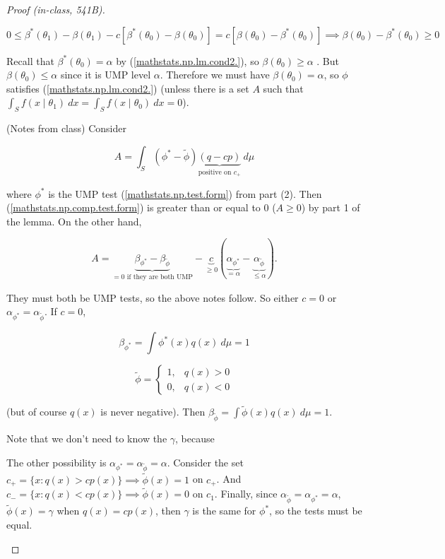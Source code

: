 \begin{proof}[Proof (in-class, 541B)]
\begin{enumerate}
\[
0 \leq \beta^*(\theta_1) - \beta(\theta_1) - c \left[ \beta^*(\theta_0) - \beta(\theta_0) \right] = c \left[ \beta(\theta_0)  -  \beta^*(\theta_0) \right] \implies  \beta(\theta_0)  -  \beta^*(\theta_0) \geq 0
\]

Recall that \(\beta^*(\theta_0) = \alpha\) by (\ref{mathstats.np.lm.cond2.}), so \(  \beta(\theta_0) \geq \alpha\) . But \(  \beta(\theta_0) \leq \alpha\) since it is UMP level \(\alpha\). Therefore we must have \(  \beta(\theta_0) = \alpha\), so \(\phi\) satisfies (\ref{mathstats.np.lm.cond2.}) (unless there is a set \(A\) such that \(\int_S f(x \mid \theta_1) \ dx = \int_S f(x \mid \theta_0) \ dx = 0\)).


(Notes from class) Consider 

\begin{equation}\label{mathstats.np.comp.test.form}
A = \int_S (\phi^* - \tilde{\phi}) \underbrace{(q - cp)}_{\text{positive on } c_+} \ d\mu
\end{equation}

where \(\phi^*\) is the UMP test (\ref{mathstats.np.test.form}) from part (2). Then (\ref{mathstats.np.comp.test.form}) is greater than or equal to 0 (\(A \geq 0\)) by part 1 of the lemma. On the other hand,

\[
A = \underbrace{\beta_{\phi^*} - \beta_{\tilde{\phi}}}_{=0 \text{ if they are both UMP}} - \underbrace{c}_{\geq 0} \left( \underbrace{\alpha_{\phi^*}}_{= \alpha} - \underbrace{\alpha_{\tilde{\phi}}}_{\leq \alpha} \right).
\]

They must both be UMP tests, so the above notes follow. So either \(c = 0\) or \(\alpha_{\phi^*} = \alpha_{\tilde{\phi}}\). If \(c = 0\), 

\[
\beta_{\phi^*}  = \int \phi^*(x) q(x) \ d \mu = 1
\]


\[
\tilde{\phi} = \begin{cases}
1, & q(x) > 0 \\
0, & q(x) < 0
\end{cases}
\]

(but of course \(q(x)\) is never negative). Then \(\beta_{\tilde{\phi}} = \int \tilde{\phi}(x) q(x) \ d\mu = 1\).

Note that we don't need to know the \(\gamma\), because 

The other possibility is \(\alpha_{\phi^*} = \alpha_{\tilde{\phi}} = \alpha \). Consider the set \(c_+ = \{x : q(x) > c p(x)\} \implies \tilde{\phi}(x) = 1\) on \(c_+\). And \(c_- = \{x: q(x) < c p(x) \} \implies \tilde{\phi}(x) = 0 \) on \(c_1\). Finally, since \( \alpha_{\tilde{\phi}} = \alpha_{\phi^*} = \alpha\), \(\tilde{\phi}(x) = \gamma\) when \(q(x) = c p(x)\), then \(\gamma\) is the same for \(\phi^*\), so the tests must be equal.

\end{enumerate}

\end{proof}

